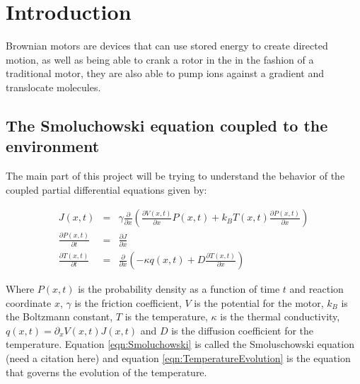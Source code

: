 \documentclass[
10pt, %
a4paper, %
oneside, %
headinclude,footinclude, %
BCOR5mm, %
]{scrartcl}
\begin{document}

\newpage %


\section{Introduction}

Brownian motors are devices that can use stored energy to create directed motion, as well as being able to crank a rotor in the in the fashion of a traditional motor, they are also able to pump ions against a gradient and translocate molecules.
 
\subsection{The Smoluchowski equation coupled to the environment}

The main part of this project will be trying to understand the behavior of the coupled partial differential equations given by:

\begin{eqnarray}
J(x, t) &=& \gamma \frac{\partial}{\partial x} \left ( \frac{\partial V(x, t)}{\partial x} P(x, t) + k_B T(x, t) \frac{\partial P(x, t)}{\partial x} \right )  \\
\frac{\partial P(x, t)}{\partial t} &=& \frac{\partial J}{\partial x} \label{eqn:Smoluchowski} \\
\frac{\partial T(x, t)}{\partial t} &=& \frac{\partial}{\partial x} \left ( -\kappa q(x, t) + D \frac{\partial T(x, t)}{\partial x} \right ) \label{eqn:TemperatureEvolution}
\end{eqnarray} 

Where $P(x, t)$ is the probability density as a function of time $t$ and reaction coordinate $x$,  $\gamma$ is the friction coefficient, $V$ is the potential for the motor, $k_B$ is the Boltzmann constant, $T$ is the temperature, $\kappa$ is the thermal conductivity, $q(x, t) = \partial_x V(x, t) J(x, t)$ and $D$ is the diffusion coefficient for the temperature. Equation \ref{eqn:Smoluchowski} is called the Smoluschowski equation (need a citation here) and equation \ref{eqn:TemperatureEvolution} is the equation that governs the evolution of the temperature.
\end{document}

